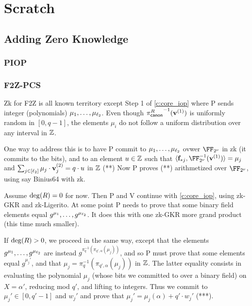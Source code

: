 \documentclass[11pt,letterpaper,usenames,dvipsnames]{article}
\begin{document}
\section{Scratch}




\subsection{Adding Zero Knowledge}

\subsubsection{PIOP}

\subsubsection{F2Z-PCS}
 Zk for F2Z is all known territory except Step 1 of \cref{c:core_iop} where P sends integer (polynomials) $\mu_1,\ldots, \mu_{\ell_2}$. Even though  ${\pi_{\mathsf{canon}}^R}^{-1}(\mathbf{v}^{(1)})$ is uniformly random in $[0,q-1]$, the elements $\mu_i$ do not follow a uniform distribution over any interval in $\mathbb{Z}$.

One way to address this is to have P commit to $\mu_1, \ldots, \mu_{\ell_2}$ ovwer $\comfield$ in zk (it commits to the bits), and to an element $u\in \mathbb{Z}$ such that $\langle \bff_{*j}, \comfield^{-1}(\vv^{(1)})\rangle = \mu_j$ and $\sum_{j\in[\ell_2]} \mu_j \cdot \mathbf{v}_j^{(2)} =  q\cdot u$ in $\mathbb{Z}$ (**)  Now P proves (**) arithmetized over $\comfield$, using say Binius64 with zk. 

Assume $\deg(R)=0$ for now. Then P and V continue with \cref{c:core_iop}, using zk-GKR and zk-Ligerito. At some point P needs to prove that some binary field elements equal $g^{\mu_1},\ldots, g^{\mu_{\ell_2}}$. It does this with one zk-GKR more grand product (this time much smaller).

If $\deg(R)>0$, we proceed in the same way, except that the elements $g^{\mu_1},\ldots, g^{\mu_{\ell_2}}$ are instead $g^{\pi_q^{-1}(\pi_{q',\alpha}(\mu_j))}$, and so P must prove that some elements equal $g^{\mu_j'}$, and that $\mu_j = \pi_q^{-1}(\pi_{q',\alpha}(\mu_j))$ in $\mathbb{Z}$. The latter equality  consists in evaluating the polynomial $\mu_j$ (whose bits we committed to over a binary field) on $X=\alpha'$, reducing mod $q'$, and lifting to integers. Thus we commit to $\mu_j'\in [0, q'-1]$ and $w_j'$ and prove that $\mu_j' = \mu_j(\alpha) + q' \cdot w_j'$ (***). 
\end{document}
